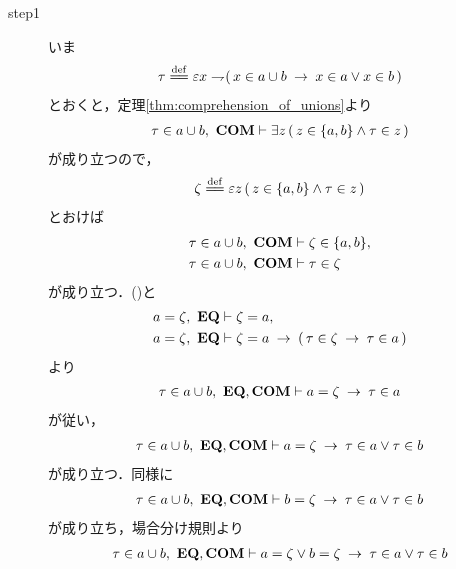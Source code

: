 	\begin{sketch}\mbox{}
		\begin{description}
			\item[step1]
				いま
				\begin{align}
					\tau \defeq \varepsilon x \negation 
					(\, x \in a \cup b \rarrow x \in a \vee x \in b\, )
				\end{align}
				とおくと，定理\ref{thm:comprehension_of_unions}より
				\begin{align}
					\tau \in a \cup b,\ \mbox{\bf COM} \vdash
					\exists z\, (\, z \in \{a,b\} \wedge \tau \in z\, )
				\end{align}
				が成り立つので，
				\begin{align}
					\zeta \defeq \varepsilon z\, 
					(\, z \in \{a,b\} \wedge \tau \in z\, )
				\end{align}
				とおけば
				\begin{align}
					\tau \in a \cup b,\ \mbox{\bf COM} &\vdash \zeta \in \{a,b\}, 
					\label{fom:union_of_pair_is_union_of_their_elements_1} \\
					\tau \in a \cup b,\ \mbox{\bf COM} &\vdash \tau \in \zeta
					\label{fom:union_of_pair_is_union_of_their_elements_2}
				\end{align}
				が成り立つ．()と
				\begin{align}
					a = \zeta,\ \mbox{{\bf EQ}} &\vdash \zeta = a, \\
					a = \zeta,\ \mbox{{\bf EQ}} &\vdash \zeta = a \hspace{0.25em}\rightarrow\hspace{0.25em}
					(\, \tau \in \zeta \hspace{0.25em}\rightarrow\hspace{0.25em} \tau \in a\, )
				\end{align}
				より
				\begin{align}
					\tau \in a \cup b,\ \mbox{{\bf EQ}},\mbox{\bf COM} \vdash
					a = \zeta \hspace{0.25em}\rightarrow\hspace{0.25em} \tau \in a 
				\end{align}
				が従い，
				\begin{align}
					\tau \in a \cup b,\ \mbox{{\bf EQ}},\mbox{\bf COM} \vdash
					a = \zeta \hspace{0.25em}\rightarrow\hspace{0.25em} \tau \in a \vee \tau \in b
				\end{align}
				が成り立つ．同様に
				\begin{align}
					\tau \in a \cup b,\ \mbox{{\bf EQ}},\mbox{\bf COM} \vdash
					b = \zeta \hspace{0.25em}\rightarrow\hspace{0.25em} \tau \in a \vee \tau \in b
				\end{align}
				が成り立ち，場合分け規則より
				\begin{align}
					\tau \in a \cup b,\ \mbox{{\bf EQ}},\mbox{\bf COM} \vdash
					a = \zeta \vee b = \zeta \hspace{0.25em}\rightarrow\hspace{0.25em} \tau \in a \vee \tau \in b
					\label{fom:union_of_pair_is_union_of_their_elements_3}
				\end{align}

\end{description}
\end{sketch}
